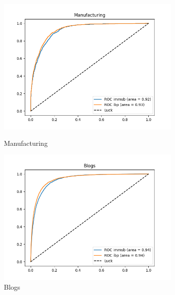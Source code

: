\begin{figure}[h]
\begin{subfigure}[b]{0.300\textwidth}
            \centering
            \includegraphics[width=\textwidth]{img/corpus/roc_manufacturing}
            \label{fig:mean and std of net14}
            \caption {{\small Manufacturing}}    
        \end{subfigure}
        \begin{subfigure}[b]{0.300\textwidth}
            \centering
            \includegraphics[width=\textwidth]{img/corpus/roc_blogs}
            \caption {{\small Blogs}}    
            \label{fig:mean and std of net14}
        \end{subfigure}
        \begin{subfigure}[b]{0.300\textwidth}
            \centering

\end{subfigure}
\end{figure}
